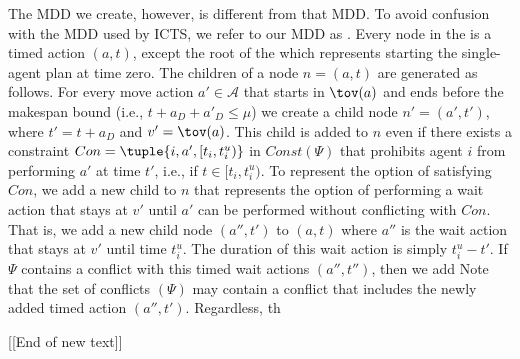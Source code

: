 
The MDD we create, however, is different from that MDD. 
To avoid confusion with the MDD used by ICTS, we refer to our MDD as \mddr. 
Every node in the \mddr is a timed action $(a,t)$, 
except the root of the \mddr which represents starting the single-agent plan at time zero. 
The children of a node $n=(a,t)$ are generated as follows. 
For every move action $a'\in \mathcal{A}$ 
that starts in $\tov(a)$ and ends before the makespan bound (i.e., $t+a_D+a'_D\leq \mu$)
we create a child node $n'=(a',t')$, 
where $t'=t+a_D$ and $v'=\tov(a)$. 
This child is added to $n$ even if there exists a constraint $Con=\tuple{i, a', [t_i, t_i^u)}$ in $Const(\Psi)$ that prohibits agent $i$ from performing $a'$ at time $t'$, i.e., 
if $t\in[t_i, t_i^u)$. 
To represent the option of satisfying $Con$, we add a new child to $n$ that represents the option of performing a wait action that stays at $v'$ until $a'$ can be performed without conflicting with $Con$. 
That is, we add a new child node $(a'', t')$ to $(a,t)$ where $a''$ is the wait action that stays at $v'$ until time $t_i^u$. The duration of this wait action is simply $t_i^u-t'$. 
If $\Psi$ contains a conflict with this timed wait actions $(a'',t'')$, then we add 
Note that the set of conflicts $(\Psi)$ may contain a conflict that includes the newly added timed action $(a'',t')$. 
Regardless, th



[[End of new text]]